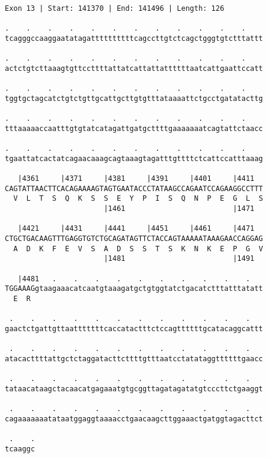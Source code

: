 \documentclass{article}
\begin{document}
\newpage
\begin{Verbatim}[fontfamily=courier]
Exon 13 | Start: 141370 | End: 141496 | Length: 126

.    .    .    .    .    .    .    .    .    .    .    .    
tcagggccaaggaatatagattttttttttcagccttgtctcagctgggtgtctttattt

.    .    .    .    .    .    .    .    .    .    .    .    
actctgtcttaaagtgttccttttattatcattattattttttaatcattgaattccatt

.    .    .    .    .    .    .    .    .    .    .    .    
tggtgctagcatctgtctgttgcattgcttgtgtttataaaattctgcctgatatacttg

.    .    .    .    .    .    .    .    .    .    .    .    
tttaaaaaccaatttgtgtatcatagattgatgcttttgaaaaaaatcagtattctaacc

.    .    .    .    .    .    .    .    .    .    .    .    
tgaattatcactatcagaacaaagcagtaaagtagatttgttttctcattccatttaaag

   |4361     |4371     |4381     |4391     |4401     |4411  
CAGTATTAACTTCACAGAAAAGTAGTGAATACCCTATAAGCCAGAATCCAGAAGGCCTTT
  V  L  T  S  Q  K  S  S  E  Y  P  I  S  Q  N  P  E  G  L  S
                       |1461                         |1471  

   |4421     |4431     |4441     |4451     |4461     |4471  
CTGCTGACAAGTTTGAGGTGTCTGCAGATAGTTCTACCAGTAAAAATAAAGAACCAGGAG
  A  D  K  F  E  V  S  A  D  S  S  T  S  K  N  K  E  P  G  V
                       |1481                         |1491  

   |4481   .    .    .    .    .    .    .    .    .    .   
TGGAAAGgtaagaaacatcaatgtaaagatgctgtggtatctgacatctttatttatatt
  E  R                                                      

 .    .    .    .    .    .    .    .    .    .    .    .   
gaactctgattgttaatttttttcaccatactttctccagttttttgcatacaggcattt

 .    .    .    .    .    .    .    .    .    .    .    .   
atacacttttattgctctaggatacttcttttgtttaatcctatataggttttttgaacc

 .    .    .    .    .    .    .    .    .    .    .    .   
tataacataagctacaacatgagaaatgtgcggttagatagatatgtcccttctgaaggt

 .    .    .    .    .    .    .    .    .    .    .    .   
cagaaaaaaatataatggaggtaaaacctgaacaagcttggaaactgatggtagacttct

 .    .
tcaaggc
\end{Verbatim}
\newpage
\end{document}
